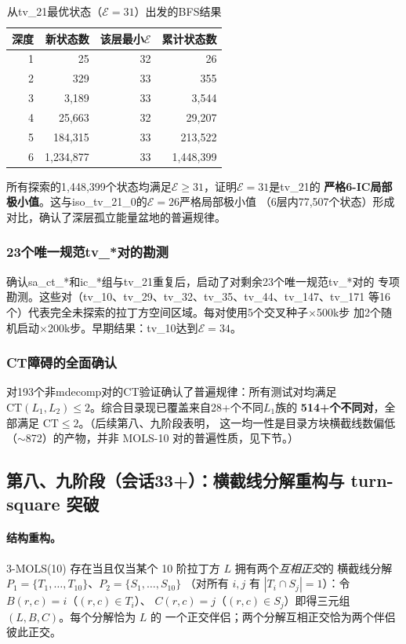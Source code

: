 \documentclass[11pt,a4paper]{ctexart}
\theoremstyle{remark}
\newcommand{\CT}{\mathrm{CT}}
\newcommand{\E}{\mathcal{E}}
\begin{document}
\begin{table}[h]
\centering
\caption{从tv\_21最优状态（$\E=31$）出发的BFS结果}
\label{tab:bfs_tv21_zh}
\begin{tabular}{rrrr}
\toprule
深度 & 新状态数 & 该层最小$\E$ & 累计状态数\\
\midrule
1 & 25 & 32 & 26\\
2 & 329 & 33 & 355\\
3 & 3{,}189 & 33 & 3{,}544\\
4 & 25{,}663 & 32 & 29{,}207\\
5 & 184{,}315 & 33 & 213{,}522\\
6 & 1{,}234{,}877 & 33 & 1{,}448{,}399\\
\bottomrule
\end{tabular}
\end{table}

所有探索的1,448,399个状态均满足$\E \geq 31$，证明$\E=31$是tv\_21的
\textbf{严格6-IC局部极小值}。这与iso\_tv\_21\_0的$\E=26$严格局部极小值
（6层内77,507个状态）形成对比，确认了深层孤立能量盆地的普遍规律。

\subsubsection{23个唯一规范tv\_*对的勘测}

确认sa\_ct\_*和ic\_*组与tv\_21重复后，启动了对剩余23个唯一规范tv\_*对的
专项勘测。这些对（tv\_10、tv\_29、tv\_32、tv\_35、tv\_44、tv\_147、tv\_171
等16个）代表完全未探索的拉丁方空间区域。每对使用5个交叉种子×500k步
加2个随机启动×200k步。早期结果：tv\_10达到$\E=34$。

\subsubsection{CT障碍的全面确认}

对193个非mdecomp对的CT验证确认了普遍规律：所有测试对均满足
$\CT(L_1, L_2) \leq 2$。综合目录现已覆盖来自28+个不同$L_1$族的
\textbf{514+个不同对}，全部满足 $\CT \leq 2$。（后续第八、九阶段表明，
这一均一性是目录方块横截线数偏低（$\sim$872）的产物，并非 MOLS-10
对的普遍性质，见下节。）

\subsection{第八、九阶段（会话33+）：横截线分解重构与 turn-square 突破}
\label{sec:stage89-zh}

\paragraph{结构重构。}
3-MOLS(10) 存在当且仅当某个 10 阶拉丁方 $L$ 拥有两个\emph{互相正交}的
横截线分解 $P_1 = \{T_1,\dots,T_{10}\}$、$P_2 = \{S_1,\dots,S_{10}\}$
（对所有 $i,j$ 有 $|T_i \cap S_j| = 1$）：令 $B(r,c)=i$（$(r,c)\in T_i$）、
$C(r,c)=j$（$(r,c)\in S_j$）即得三元组 $(L,B,C)$。每个分解恰为 $L$ 的
一个正交伴侣；两个分解互相正交恰为两个伴侣彼此正交。
\end{document}
